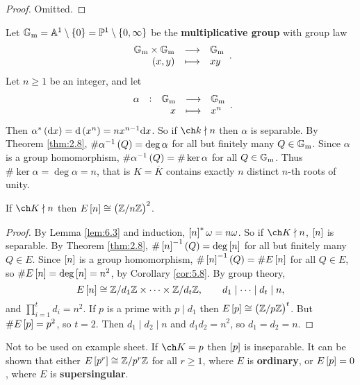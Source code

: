 \begin{proof}
Omitted.
\end{proof}


\begin{example*}
Let $ \GG_\m = \AA^1 \setminus \cbr{0} = \PP^1 \setminus \cbr{0, \infty} $ be the \textbf{multiplicative group} with group law
$$ \function{\GG_\m \times \GG_\m}{\GG_\m}{\br{x, y}}{xy}. $$
Let $ n \ge 1 $ be an integer, and let
$$ \function[\alpha]{\GG_\m}{\GG_\m}{x}{x^n}. $$
Then $ \alpha^*\br{\d x} = \d\br{x^n} = nx^{n - 1}\d x $. So if $ \ch k \nmid n $ then $ \alpha $ is separable. By Theorem \ref{thm:2.8}, $ \#\alpha^{-1}\br{Q} = \deg \alpha $ for all but finitely many $ Q \in \mathbb{G}_{\mathrm{m}} $. Since $ \alpha $ is a group homomorphism, $ \#\alpha^{-1}\br{Q} = \#\ker \alpha $ for all $ Q \in \mathbb{G}_{\mathrm{m}} $. Thus $ \#\ker \alpha = \deg \alpha = n $, that is $ K = \overline{K} $ contains exactly $ n $ distinct $ n $-th roots of unity.
\end{example*}

\begin{theorem}
If $ \ch K \nmid n $ then $ E\sbr{n} \cong \br{\ZZ / n\ZZ}^2 $.
\end{theorem}

\begin{proof}
By Lemma \ref{lem:6.3} and induction, $ \sbr{n}^*\omega = n\omega $. So if $ \ch K \nmid n $, $ \sbr{n} $ is separable. By Theorem \ref{thm:2.8}, $ \#\sbr{n}^{-1}\br{Q} = \deg \sbr{n} $ for all but finitely many $ Q \in E $. Since $ \sbr{n} $ is a group homomorphism, $ \#\sbr{n}^{-1}\br{Q} = \#E\sbr{n} $ for all $ Q \in E $, so $ \#E\sbr{n} = \deg \sbr{n} = n^2 $, by Corollary \ref{cor:5.8}. By group theory,
$$ E\sbr{n} \cong \ZZ / d_1\ZZ \times \dots \times \ZZ / d_t\ZZ, \qquad d_1 \mid \dots \mid d_t \mid n, $$
and $ \prod_{i = 1}^t d_i = n^2 $. If $ p $ is a prime with $ p \mid d_1 $ then $ E\sbr{p} \cong \br{\ZZ / p\ZZ}^t $. But $ \#E\sbr{p} = p^2 $, so $ t = 2 $. Then $ d_1 \mid d_2 \mid n $ and $ d_1d_2 = n^2 $, so $ d_1 = d_2 = n $.
\end{proof}

\begin{remark*}
Not to be used on example sheet. If $ \ch K = p $ then $ \sbr{p} $ is inseparable. It can be shown that either $ E\sbr{p^r} \cong \ZZ / p^r\ZZ $ for all $ r \ge 1 $, where $ E $ is \textbf{ordinary}, or $ E\sbr{p} = 0 $, where $ E $ is \textbf{supersingular}.
\end{remark*}

